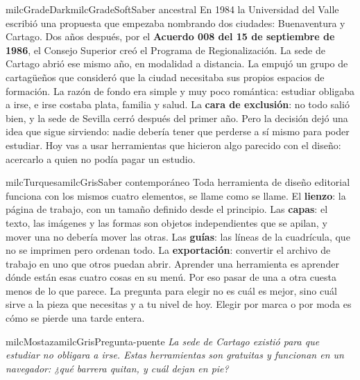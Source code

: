 \documentclass[11pt,letterpaper]{article}
\begin{document}
\begin{softbox}{milcGradeDark}{milcGradeSoft}{Saber ancestral}
En 1984 la Universidad del Valle escribió una propuesta que empezaba nombrando dos ciudades: Buenaventura y Cartago. Dos años después, por el \textbf{Acuerdo 008 del 15 de septiembre de 1986}, el Consejo Superior creó el Programa de Regionalización. La sede de Cartago abrió ese mismo año, en modalidad a distancia. La empujó un grupo de cartagüeños que consideró que la ciudad necesitaba sus propios espacios de formación. La razón de fondo era simple y muy poco romántica: estudiar obligaba a irse, e irse costaba plata, familia y salud. La \textbf{cara de exclusión}: no todo salió bien, y la sede de Sevilla cerró después del primer año. Pero la decisión dejó una idea que sigue sirviendo: nadie debería tener que perderse a sí mismo para poder estudiar. Hoy vas a usar herramientas que hicieron algo parecido con el diseño: acercarlo a quien no podía pagar un estudio.\par{}
\end{softbox}

\begin{softbox}{milcTurquesa}{milcGris}{Saber contemporáneo}
Toda herramienta de diseño editorial funciona con los mismos cuatro elementos, se llame como se llame. El \textbf{lienzo}: la página de trabajo, con un tamaño definido desde el principio. Las \textbf{capas}: el texto, las imágenes y las formas son objetos independientes que se apilan, y mover una no debería mover las otras. Las \textbf{guías}: las líneas de la cuadrícula, que no se imprimen pero ordenan todo. La \textbf{exportación}: convertir el archivo de trabajo en uno que otros puedan abrir. Aprender una herramienta es aprender dónde están esas cuatro cosas en su menú. Por eso pasar de una a otra cuesta menos de lo que parece. La pregunta para elegir no es cuál es mejor, sino cuál sirve a la pieza que necesitas y a tu nivel de hoy. Elegir por marca o por moda es cómo se pierde una tarde entera.
\end{softbox}

\begin{softbox}{milcMostaza}{milcGris}{Pregunta-puente}
\textit{La sede de Cartago existió para que estudiar no obligara a irse. Estas herramientas son gratuitas y funcionan en un navegador: ¿qué barrera quitan, y cuál dejan en pie?}
\end{softbox}
\end{document}
